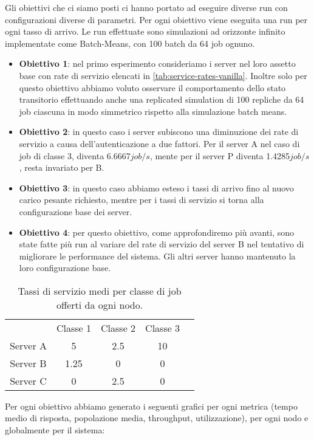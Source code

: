 Gli obiettivi che ci siamo posti ci hanno portato ad eseguire diverse run con configurazioni diverse di parametri. Per ogni obiettivo viene eseguita una run per ogni tasso di arrivo. Le run effettuate sono simulazioni ad orizzonte infinito implementate come Batch-Means, con 100 batch da 64 job ognuno.\\
\begin{itemize}
    \item \textbf{Obiettivo 1}: nel primo esperimento consideriamo i server nel loro assetto base con rate di servizio elencati in \autoref{tab:service-rates-vanilla}.
    Inoltre solo per questo obiettivo abbiamo voluto osservare il comportamento dello stato transitorio effettuando anche una replicated simulation di 100 repliche da 64 job ciascuna in modo simmetrico rispetto alla simulazione batch means.
    \item \textbf{Obiettivo 2}: in questo caso i server subiscono una diminuzione dei rate di servizio a causa dell'autenticazione a due fattori. Per il server A nel caso di job di classe 3, diventa 6.6667$job/s$, mente per il server P diventa 1.4285$job/s$, resta invariato per B.
    \item \textbf{Obiettivo 3}: in questo caso abbiamo esteso i tassi di arrivo fino al nuovo carico pesante richiesto, mentre per i tassi di servizio si torna alla configurazione base dei server.
    \item \textbf{Obiettivo 4}: per questo obiettivo, come approfondiremo più avanti, sono state fatte più run al variare del rate di servizio del server B nel tentativo di migliorare le performance del sistema. Gli altri server hanno mantenuto la loro configurazione base.
\end{itemize}
\begin{table}
    \centering
    \caption{Tassi di servizio medi per classe di job offerti da ogni nodo.}
    \begin{tabular}{ccccc}
         & Classe 1 & Classe 2 & Classe 3 \\
         Server A & 5 & 2.5 & 10\\
         Server B & 1.25 & 0 & 0\\
         Server C & 0 & 2.5 & 0\\
    \end{tabular}
    \label{tab:service-rates-vanilla}
\end{table}
Per ogni obiettivo abbiamo generato i seguenti grafici per ogni metrica (tempo medio di risposta, popolazione media, throughput, utilizzazione), per ogni nodo e globalmente per il sistema:

